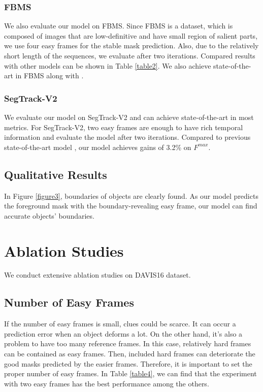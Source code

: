 \documentclass[letterpaper]{article} \usepackage{aaai22}  \usepackage{times}  \usepackage{helvet}  \usepackage{courier}  \usepackage[hyphens]{url}  \usepackage{graphicx} \urlstyle{rm} \def\UrlFont{\rm}  \usepackage{natbib}  \usepackage{caption} \DeclareCaptionStyle{ruled}{labelfont=normalfont,labelsep=colon,strut=off} \frenchspacing  \setlength{\pdfpagewidth}{8.5in}  \setlength{\pdfpageheight}{11in}  \usepackage{algorithm}
\begin{document}
\subsubsection{FBMS}

We also evaluate our model on FBMS. Since FBMS is a dataset, which is composed of images that are low-definitive and have small region of salient parts, we use four easy frames for the stable mask prediction. Also, due to the relatively short length of the sequences, we evaluate after two iterations. Compared results with other models can be shown in Table \ref{table2}. We also achieve state-of-the-art in FBMS along with \citet{liu2020f2net}.

\subsubsection{SegTrack-V2}

We evaluate our model on SegTrack-V2 and can achieve state-of-the-art in most metrics. For SegTrack-V2, two easy frames are enough to have rich temporal information and evaluate the model after two iterations. Compared to previous state-of-the-art model \citep{gu2020pyramid}, our model achieves gains of 3.2\% on $F^{max}$.

\subsection{Qualitative Results}

In Figure \ref{figure3}, boundaries of objects are clearly found. As our model predicts the foreground mask with the boundary-revealing easy frame, our model can find accurate objects’ boundaries. 

\section{Ablation Studies}

We conduct extensive ablation studies on DAVIS16 \citep{Perazzi2016} dataset.

\subsection{Number of Easy Frames}

If the number of easy frames is small, clues could be scarce. It can occur a prediction error when an object deforms a lot. On the other hand, it’s also a problem to have too many reference frames. In this case, relatively hard frames can be contained as easy frames. Then, included hard frames can deteriorate the good masks predicted by the easier frames. Therefore, it is important to set the proper number of easy frames. In Table \ref{table4}, we can find that the experiment with two easy frames has the best performance among the others. 
\end{document}
